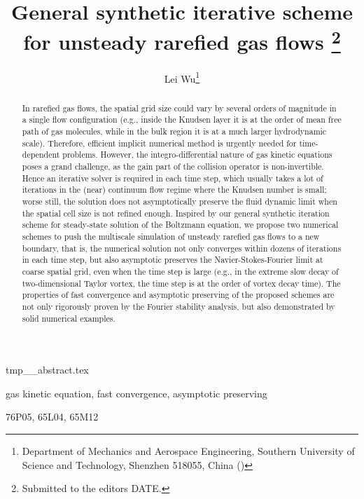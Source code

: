 \documentclass[onefignum,onetabnum]{siamart171218}
\title{General synthetic iterative scheme for unsteady rarefied gas flows
		 \thanks{Submitted to the editors DATE.
	}}
\author{
		 Lei Wu\thanks{Department of Mechanics and Aerospace Engineering, Southern University of Science and Technology, Shenzhen 518055, China (\email{wul@sustech.edu.cn}) }%
	}
\newcounter{example}
\begin{document}
	\maketitle

	\begin{tcbverbatimwrite}{tmp_\jobname_abstract.tex}
		\begin{abstract}
	In rarefied gas flows, the spatial grid size could vary by several orders of magnitude in  a single flow configuration (e.g., inside the Knudsen layer it is at the order of mean free path of gas molecules, while in the bulk region it is at a much larger hydrodynamic scale). Therefore, efficient implicit numerical method is urgently needed for time-dependent problems. 
	However, the integro-differential nature of gas kinetic equations poses a grand challenge, as the gain part of the collision operator is non-invertible. Hence an iterative solver is required in each time step, which usually takes a lot of iterations in the (near) continuum flow regime where the Knudsen number is small; worse still, the solution does not asymptotically preserve the fluid dynamic limit when the spatial cell size is not refined enough.
Inspired by our general synthetic iteration scheme for steady-state solution of the Boltzmann equation, we propose two numerical schemes to push the multiscale simulation of unsteady rarefied gas flows to a new boundary, that is, the numerical solution not only converges within dozens of iterations in each time step, but also asymptotic preserves the Navier-Stokes-Fourier limit at coarse spatial grid, even when the time step is large (e.g., in the extreme slow decay of two-dimensional Taylor vortex, the time step is at the order of vortex decay time). The properties of fast convergence and asymptotic preserving of the proposed schemes are not only rigorously proven by the Fourier stability analysis, but also demonstrated by solid numerical examples.	
		\end{abstract}
		
		\begin{keywords}
			gas kinetic equation, fast convergence, asymptotic preserving
		\end{keywords}
		
		\begin{AMS}
			76P05, %
			65L04, %
			65M12 %
			
		\end{AMS}
	\end{tcbverbatimwrite}
	
\end{document}
